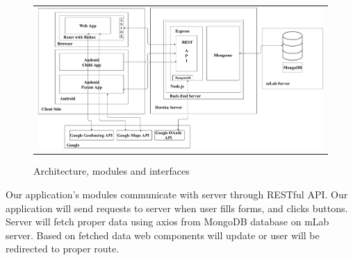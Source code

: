 \documentclass{sprawozdanie-agh}
\begin{document}
		\begin{figure}[H] 
			\centering
			\begin{tabular}{c}
				\includegraphics[width=.95\textwidth]{moduly_interfejsy_komunikacyjne}
			\end{tabular} 
			\caption{Architecture, modules and interfaces}
		\end{figure}

		Our application's modules communicate with server through RESTful API. Our application will send requests to server when user fills forms, and clicks buttons. Server will fetch proper data using axios from MongoDB database on mLab server. Based on fetched data web components will update or user will be redirected to proper route.
		
\end{document}
